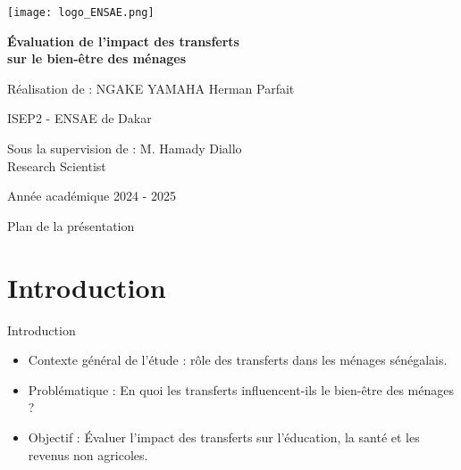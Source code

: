 \documentclass[
  11pt,
  ignorenonframetext,
]{beamer}
\author{}
\date{\vspace{-2.5em}}
\providecommand{\tightlist}{%
  \setlength{\itemsep}{0pt}\setlength{\parskip}{0pt}}
\begin{document}
\begin{frame}
\begin{center}
\texttt{[image: logo\_ENSAE.png]}

\vspace{0.8cm}

{\Large \textbf{Évaluation de l’impact des transferts \\[0.2cm] sur le bien-être des ménages}}

\vspace{1cm}

{\normalsize Réalisation de : NGAKE YAMAHA Herman Parfait}

\vspace{0.5cm}

{\small ISEP2 - ENSAE de Dakar}

\vspace{0.5cm}

{\small Sous la supervision de : M. Hamady Diallo\\ Research Scientist}

{\small Année académique 2024 - 2025}

\vspace{0.8cm}
\end{center}


\end{frame}

\begin{frame}{Plan de la présentation}
\label{plan-de-la-pruxe9sentation}
\tableofcontents


\end{frame}

\section{Introduction}\label{introduction}

\begin{frame}{Introduction}
\begin{itemize}
\tightlist
\item
  Contexte général de l'étude : rôle des transferts dans les ménages
  sénégalais.
\item
  Problématique : En quoi les transferts influencent-ils le bien-être
  des ménages ?
\item
  Objectif : Évaluer l'impact des transferts sur l'éducation, la santé
  et les revenus non agricoles.
\end{itemize}
\end{frame}
\end{document}
